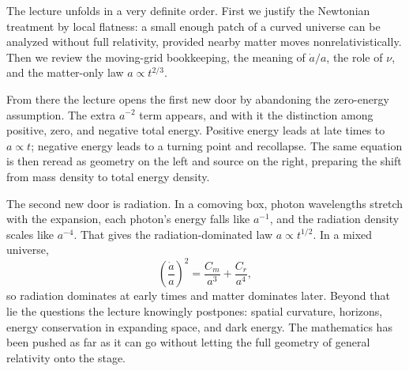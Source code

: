 The lecture unfolds in a very definite order. First we justify the Newtonian treatment by local flatness: a small enough patch of a curved universe can be analyzed without full relativity, provided nearby matter moves nonrelativistically. Then we review the moving-grid bookkeeping, the meaning of \(\dot a/a\), the role of \(\nu\), and the matter-only law \(a\propto t^{2/3}\).

From there the lecture opens the first new door by abandoning the zero-energy assumption. The extra \(a^{-2}\) term appears, and with it the distinction among positive, zero, and negative total energy. Positive energy leads at late times to \(a\propto t\); negative energy leads to a turning point and recollapse. The same equation is then reread as geometry on the left and source on the right, preparing the shift from mass density to total energy density.

The second new door is radiation. In a comoving box, photon wavelengths stretch with the expansion, each photon's energy falls like \(a^{-1}\), and the radiation density scales like \(a^{-4}\). That gives the radiation-dominated law \(a\propto t^{1/2}\). In a mixed universe,
\begin{equation}
\left(\frac{\dot a}{a}\right)^2=\frac{C_m}{a^3}+\frac{C_r}{a^4},
\end{equation}
so radiation dominates at early times and matter dominates later. Beyond that lie the questions the lecture knowingly postpones: spatial curvature, horizons, energy conservation in expanding space, and dark energy. The mathematics has been pushed as far as it can go without letting the full geometry of general relativity onto the stage.